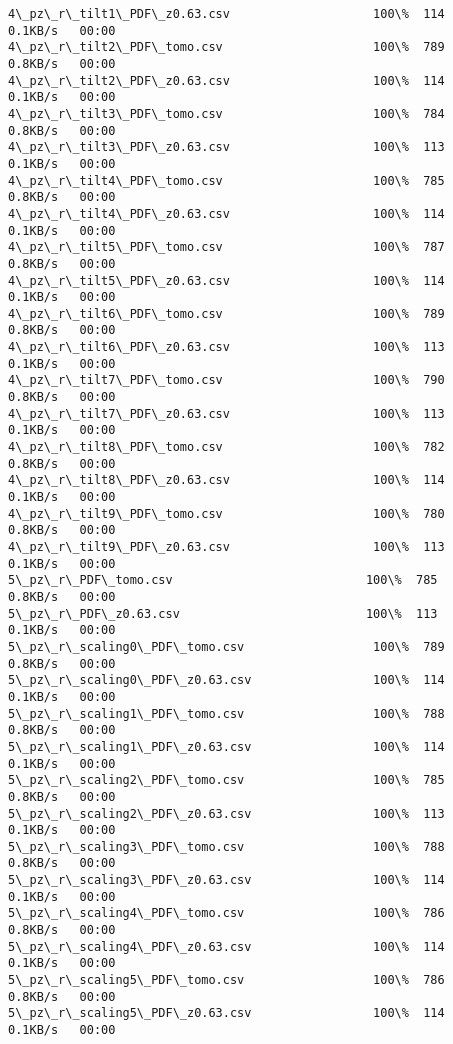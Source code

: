 \documentclass[11pt]{article}
\begin{document}
\begin{Verbatim}[commandchars=\\\{\}]
4\_pz\_r\_tilt1\_PDF\_z0.63.csv                    100\%  114     0.1KB/s   00:00    
4\_pz\_r\_tilt2\_PDF\_tomo.csv                     100\%  789     0.8KB/s   00:00    
4\_pz\_r\_tilt2\_PDF\_z0.63.csv                    100\%  114     0.1KB/s   00:00    
4\_pz\_r\_tilt3\_PDF\_tomo.csv                     100\%  784     0.8KB/s   00:00    
4\_pz\_r\_tilt3\_PDF\_z0.63.csv                    100\%  113     0.1KB/s   00:00    
4\_pz\_r\_tilt4\_PDF\_tomo.csv                     100\%  785     0.8KB/s   00:00    
4\_pz\_r\_tilt4\_PDF\_z0.63.csv                    100\%  114     0.1KB/s   00:00    
4\_pz\_r\_tilt5\_PDF\_tomo.csv                     100\%  787     0.8KB/s   00:00    
4\_pz\_r\_tilt5\_PDF\_z0.63.csv                    100\%  114     0.1KB/s   00:00    
4\_pz\_r\_tilt6\_PDF\_tomo.csv                     100\%  789     0.8KB/s   00:00    
4\_pz\_r\_tilt6\_PDF\_z0.63.csv                    100\%  113     0.1KB/s   00:00    
4\_pz\_r\_tilt7\_PDF\_tomo.csv                     100\%  790     0.8KB/s   00:00    
4\_pz\_r\_tilt7\_PDF\_z0.63.csv                    100\%  113     0.1KB/s   00:00    
4\_pz\_r\_tilt8\_PDF\_tomo.csv                     100\%  782     0.8KB/s   00:00    
4\_pz\_r\_tilt8\_PDF\_z0.63.csv                    100\%  114     0.1KB/s   00:00    
4\_pz\_r\_tilt9\_PDF\_tomo.csv                     100\%  780     0.8KB/s   00:00    
4\_pz\_r\_tilt9\_PDF\_z0.63.csv                    100\%  113     0.1KB/s   00:00    
5\_pz\_r\_PDF\_tomo.csv                           100\%  785     0.8KB/s   00:00    
5\_pz\_r\_PDF\_z0.63.csv                          100\%  113     0.1KB/s   00:00    
5\_pz\_r\_scaling0\_PDF\_tomo.csv                  100\%  789     0.8KB/s   00:00    
5\_pz\_r\_scaling0\_PDF\_z0.63.csv                 100\%  114     0.1KB/s   00:00    
5\_pz\_r\_scaling1\_PDF\_tomo.csv                  100\%  788     0.8KB/s   00:00    
5\_pz\_r\_scaling1\_PDF\_z0.63.csv                 100\%  114     0.1KB/s   00:00    
5\_pz\_r\_scaling2\_PDF\_tomo.csv                  100\%  785     0.8KB/s   00:00    
5\_pz\_r\_scaling2\_PDF\_z0.63.csv                 100\%  113     0.1KB/s   00:00    
5\_pz\_r\_scaling3\_PDF\_tomo.csv                  100\%  788     0.8KB/s   00:00    
5\_pz\_r\_scaling3\_PDF\_z0.63.csv                 100\%  114     0.1KB/s   00:00    
5\_pz\_r\_scaling4\_PDF\_tomo.csv                  100\%  786     0.8KB/s   00:00    
5\_pz\_r\_scaling4\_PDF\_z0.63.csv                 100\%  114     0.1KB/s   00:00    
5\_pz\_r\_scaling5\_PDF\_tomo.csv                  100\%  786     0.8KB/s   00:00    
5\_pz\_r\_scaling5\_PDF\_z0.63.csv                 100\%  114     0.1KB/s   00:00    

\end{Verbatim}
\end{document}
